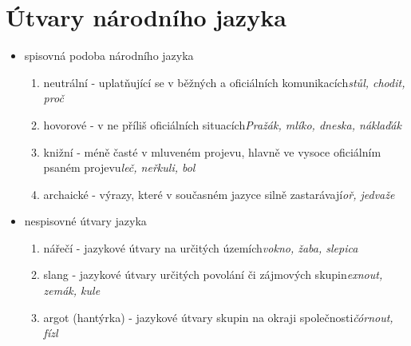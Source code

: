 \documentclass{memoir}
\begin{document}
\section*{Útvary národního jazyka}
	\begin{itemize}
		\item spisovná podoba národního jazyka
		\begin{enumerate}
			\item neutrální - uplatňující se v běžných a oficiálních komunikacích\hfill\textit{stůl, chodit, proč}
			\item hovorové - v ne příliš oficiálních situacích\hfill\textit{Pražák, mlíko, dneska, náklaďák}
			\item knižní - méně časté v mluveném projevu, hlavně ve vysoce oficiálním psaném projevu\hfill\textit{leč, neřkuli, bol}
			\item archaické - výrazy, které v současném jazyce silně zastarávají\hfill\textit{oř, jedvaže}
		\end{enumerate}
		\item nespisovné útvary jazyka
		\begin{enumerate}
			\item nářečí - jazykové útvary na určitých územích\hfill\textit{vokno, žaba, slepica}
			\item slang - jazykové útvary určitých povolání či zájmových skupin\hfill\textit{exnout, zemák, kule}
			\item argot (hantýrka) - jazykové útvary skupin na okraji společnosti\hfill\textit{čórnout, fízl}
		\end{enumerate}
	\end{itemize}
\end{document}
